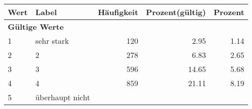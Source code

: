      \begin{longtable}{lXrrr}
     \toprule
     \textbf{Wert} & \textbf{Label} & \textbf{Häufigkeit} & \textbf{Prozent(gültig)} & \textbf{Prozent} \\
     \endhead
     \midrule
     \multicolumn{5}{l}{\textbf{Gültige Werte}}\\

     1 &
     \multicolumn{1}{X}{ sehr stark   } &


       \num{120} &
       \num[round-mode=places,round-precision=2]{2.95} &
         \num[round-mode=places,round-precision=2]{1.14} \\

     2 &
     \multicolumn{1}{X}{ 2   } &


       \num{278} &
       \num[round-mode=places,round-precision=2]{6.83} &
         \num[round-mode=places,round-precision=2]{2.65} \\

     3 &
     \multicolumn{1}{X}{ 3   } &


       \num{596} &
       \num[round-mode=places,round-precision=2]{14.65} &
         \num[round-mode=places,round-precision=2]{5.68} \\

     4 &
     \multicolumn{1}{X}{ 4   } &


       \num{859} &
       \num[round-mode=places,round-precision=2]{21.11} &
         \num[round-mode=places,round-precision=2]{8.19} \\

     5 &
     \multicolumn{1}{X}{ überhaupt nicht   } &



\end{longtable}
